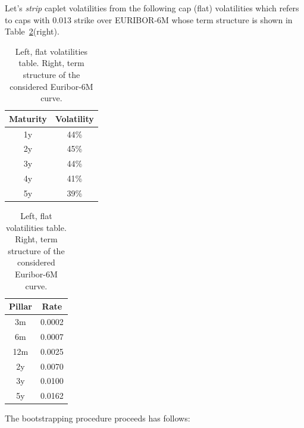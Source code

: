 \documentclass[12pt,a4paper]{article}
\begin{document}
Let's \emph{strip} caplet volatilities from the following cap (flat) volatilities which refers to caps with 0.013 strike over EURIBOR-6M whose term structure is shown in Table~\ref{tab:flat_volatilities}(right).

\begin{table}[htpb]
\begin{center}
\renewcommand{\arraystretch}{2}
\begin{tabular}{|c|c|}
\hline
Maturity & Volatility \\ \hline
1y & 44\% \\ \hline
2y & 45\% \\ \hline
3y & 44\% \\ \hline
4y & 41\% \\ \hline
5y & 39\% \\ \hline
\end{tabular}
\quad
\begin{tabular}{|c|c|}
\hline
Pillar & Rate \\ \hline
3m & 0.0002 \\ \hline
6m & 0.0007 \\ \hline
12m & 0.0025 \\ \hline
2y  & 0.0070 \\ \hline
3y & 0.0100 \\ \hline
5y & 0.0162 \\ \hline
\end{tabular}
\end{center}
\label{tab:flat_volatilities}
\caption{Left, flat volatilities table. Right, term structure of the considered Euribor-6M curve.}
\end{table}
The bootstrapping procedure proceeds has follows:
\end{document}
